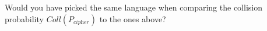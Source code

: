 \documentclass[a4paper,10pt,landscape,twocolumn]{scrartcl}
\begin{document}
\begin{exercise}
\begin{subex}[(1pt)]
Would you have picked the same language when comparing the collision probability $Coll(P_{\textit{cipher}})$ to the ones above?
\end{subex}

\end{exercise}
\end{document}
